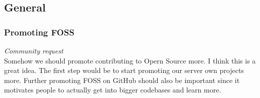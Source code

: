 \documentclass{article}
\begin{document}
    \subsection{General}

    \subsubsection{Promoting FOSS}
    \textit{Community request} \\ \newline 
    Somehow we should promote contributing to Opern Source more. 
    I think this is a great idea. 
    The first step would be to start promoting our server own projects more.
    Further promoting FOSS on GitHub should also be important since it motivates people to actually get into bigger codebases and learn more.
\end{document}
